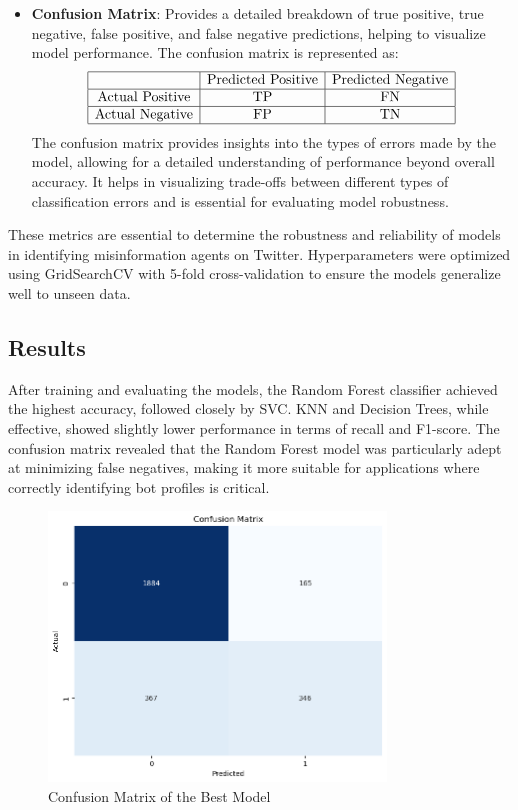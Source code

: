 \documentclass[a4paper,11pt]{article}
\begin{document}
\begin{itemize}
    \item \textbf{Confusion Matrix}: Provides a detailed breakdown of true positive, true negative, false positive, and false negative predictions, helping to visualize model performance. The confusion matrix is represented as:
    \[
    \begin{array}{|c|c|c|}
    \hline
     & \text{Predicted Positive} & \text{Predicted Negative} \\
    \hline
    \text{Actual Positive} & \text{TP} & \text{FN} \\
    \hline
    \text{Actual Negative} & \text{FP} & \text{TN} \\
    \hline
    \end{array}
    \]
    The confusion matrix provides insights into the types of errors made by the model, allowing for a detailed understanding of performance beyond overall accuracy. It helps in visualizing trade-offs between different types of classification errors and is essential for evaluating model robustness.
\end{itemize}

These metrics are essential to determine the robustness and reliability of models in identifying misinformation agents on Twitter. Hyperparameters were optimized using GridSearchCV with 5-fold cross-validation to ensure the models generalize well to unseen data.

\subsection{Results}

After training and evaluating the models, the Random Forest classifier achieved the highest accuracy, followed closely by SVC. KNN and Decision Trees, while effective, showed slightly lower performance in terms of recall and F1-score. The confusion matrix revealed that the Random Forest model was particularly adept at minimizing false negatives, making it more suitable for applications where correctly identifying bot profiles is critical.

\begin{figure}[h]
    \centering
    \includegraphics[width=0.8\textwidth]{confusion_matrix.png}
    \caption{Confusion Matrix of the Best Model}
    \label{fig:conf_matrix}
\end{figure}
\end{document}
